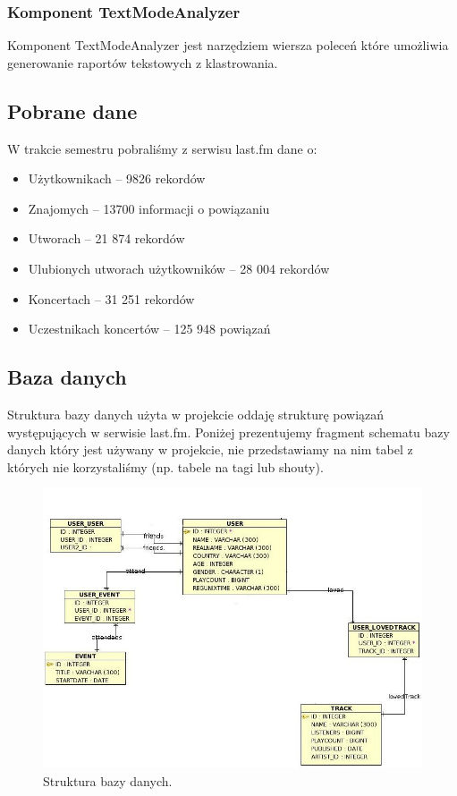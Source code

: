 \documentclass[10pt,a4paper,epic,carom]{article}
\begin{document}
\subsubsection {Komponent TextModeAnalyzer}
	Komponent TextModeAnalyzer jest narzędziem wiersza poleceń które umożliwia generowanie raportów tekstowych z klastrowania.


\subsection {Pobrane dane}
W trakcie semestru pobraliśmy z serwisu last.fm dane o:
\begin{itemize}
\item Użytkownikach – 9826 rekordów
\item Znajomych – 13700 informacji o powiązaniu
\item Utworach – 21 874 rekordów
\item Ulubionych utworach użytkowników – 28 004 rekordów
\item Koncertach – 31 251 rekordów
\item Uczestnikach koncertów – 125 948 powiązań
\end{itemize}
\subsection {Baza danych}
	Struktura bazy danych użyta w projekcie oddaję strukturę powiązań występujących w serwisie last.fm. Poniżej prezentujemy fragment schematu bazy danych który jest używany w projekcie, nie przedstawiamy na nim tabel z których nie korzystaliśmy (np. tabele na tagi lub shouty).

\begin{figure}[H]
\centering
\caption{Struktura bazy danych.}
\includegraphics[scale=0.6]{rys2.png}
\end{figure}
\end{document}
